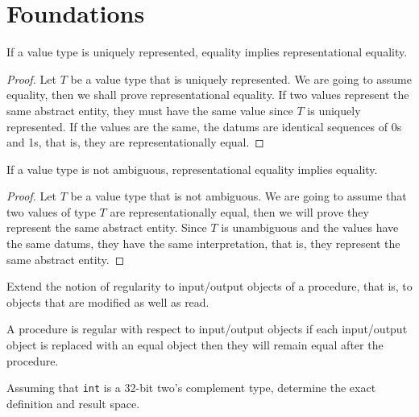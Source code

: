 
\chapter{Foundations}

\begin{lemma}
	If a value type is uniquely represented, equality implies representational equality.
\end{lemma}

\begin{proof}
	Let $T$ be a value type that is uniquely represented. We are going to assume equality,
	then we shall prove representational equality. If two values represent the same abstract entity,
	they must have the same value since $T$ is uniquely represented. If the values are the same, the datums
	are identical sequences of 0s and 1s, that is, they are representationally equal.
\end{proof}

\begin{lemma}
	If a value type is not ambiguous, representational equality implies equality.
\end{lemma}

\begin{proof}
	Let $T$ be a value type that is not ambiguous. We are going to assume that two values of type $T$ are
	representationally equal, then we will prove they represent the same abstract entity. Since $T$ is
	unambiguous and the values have the same datums, they have the same interpretation, that is, they
	represent the same abstract entity.
\end{proof}

\begin{exercise}
	Extend the notion of regularity to input/output objects of a procedure, that is, to objects that are
	modified as well as read.
\end{exercise}

\begin{solution}
	A procedure is regular with respect to input/output objects if each input/output object is replaced
	with an equal object then they will remain equal after the procedure.
\end{solution}

\begin{exercise}
	Assuming that \verb|int| is a 32-bit two's complement type, determine the exact definition and result space.
\end{exercise}
